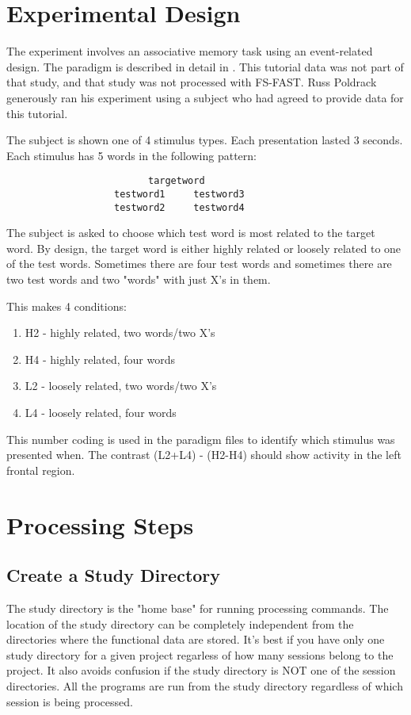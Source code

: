 \documentclass[12pt]{article}
\begin{document}
\section{Experimental Design}

The experiment involves an associative memory task using an
event-related design. The paradigm is described in detail in
\cite{Wag01}. This tutorial data was not part of that study, and that
study was not processed with FS-FAST. Russ Poldrack generously ran his
experiment using a subject who had agreed to provide data for this
tutorial.

The subject is shown one of 4 stimulus types. Each presentation lasted
3 seconds. Each stimulus has 5 words in the following pattern:

\begin{verbatim}
                         targetword
                   testword1     testword3
                   testword2     testword4
\end{verbatim}

The subject is asked to choose which test word is most related to the
target word.  By design, the target word is either highly related or
loosely related to one of the test words.  Sometimes there are four
test words and sometimes there are two test words and two "words" with
just X's in them.

This makes 4 conditions:
\begin{enumerate}
\item H2 - highly related, two words/two X's
\item H4 - highly related, four words
\item L2 - loosely related, two words/two X's
\item L4 - loosely related, four words
\end{enumerate}

This number coding is used in the paradigm files to identify which
stimulus was presented when.  The contrast (L2+L4) - (H2-H4) should
show activity in the left frontal region.

\section{Processing Steps}

\subsection{Create a Study Directory}

 The study directory is the "home base" for running processing
commands. The location of the study directory can be completely
independent from the directories where the functional data are
stored. It's best if you have only one study directory for a given
project regarless of how many sessions belong to the project. It also
avoids confusion if the study directory is NOT one of the session
directories.  All the programs are run from the study directory
regardless of which session is being processed.
\end{document}

